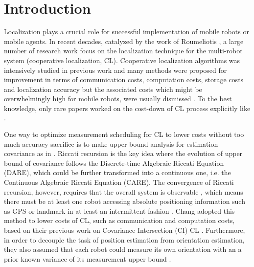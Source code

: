 \documentclass[conference]{IEEEtran}
\begin{document}
\IEEEpeerreviewmaketitle

\section{Introduction}
Localization plays a crucial role for successful implementation of mobile robots or mobile agents.
In recent decades, catalyzed by the work of Roumeliotis \cite{roumeliotis2002distributed}, a large number of research work focus on the localization technique for the multi-robot system (cooperative localization, CL).
Cooperative localization algorithms was intensively studied in previous work and many methods were proposed for improvement in terms of communication costs, computation costs, storage costs and localization accuracy \cite{luft2018recursive,kia2014centralizedequivalent,kia2015cooperative,vudinh2015serverclient,kia2016cooperative,chang2017multirobot,zhu2017consistent,kia2018serverassisted,razavi2018resourceaware,zhu2018loosely,chang2018optimal} but the associated costs which might be overwhelmingly high for mobile robots, were usually dismissed \cite{chang2018optimal}.
To the best knowledge, only rare papers worked on the cost-down of CL process explicitly like \cite{mourikis2006optimal,chang2018optimal}.

One way to optimize measurement scheduling for CL to lower costs without too much accuracy sacrifice is to make upper bound analysis for estimation covariance as in \cite{mourikis2006optimal,chang2018optimal}.
Riccati recursion is the key idea where the evolution of upper bound of covariance follows the Discrete-time Algebraic Riccati Equation (DARE), which could be further transformed into a continuous one, i.e. the Continuous Algebraic Riccati Equation (CARE).
The convergence of Riccati recursion, however, requires that the overall system is observable \cite{mourikis2006optimal,chang2018controltheoretical}, which means there must be at least one robot accessing absolute positioning information such as GPS or landmark  in at least an intermittent fashion \cite{mourikis2006optimal,roumeliotis2002distributed}.
Chang \cite{chang2018optimal,chang2018controltheoretical} adopted this method to lower costs of CL, such as communication and computation costs, based on their previous work on Covariance Intersection (CI) CL \cite{chang2017multirobot}.
Furthermore, in order to decouple the task of position estimation from orientation estimation, they also assumed that each robot could measure its own orientation with an a prior known variance of its measurement upper bound \cite{mourikis2006optimal,chang2018optimal}.
\end{document}
